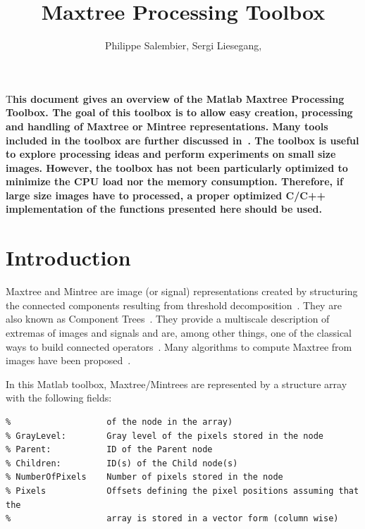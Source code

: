 \documentclass[DIV=calc, paper=a4, fontsize=11pt]{scrartcl}	 %
\title{Maxtree Processing Toolbox} %
\author{Philippe Salembier, Sergi Liesegang, } %
\date{} %
\newcommand{\initial}[1]{ %
\lettrine[lines=3,lhang=0.3,nindent=0em]{
\color{DarkGoldenrod}
{\textsf{#1}}}{}}
\begin{document}
\maketitle %

\thispagestyle{fancy} %


\initial{T}\textbf{his document gives an overview of the Matlab Maxtree Processing Toolbox. The goal of this toolbox is to allow easy creation, processing and handling of Maxtree or Mintree representations. Many tools included in the toolbox are further discussed in~\cite{Salembier-TIP-2017}. The toolbox is useful to explore processing ideas and perform experiments on small size images. However, the toolbox has not been particularly optimized to minimize the CPU load nor the memory consumption. Therefore, if large size images have to processed, a proper optimized C/C++ implementation of the functions presented here should be used. }

\tableofcontents

\section{Introduction}

Maxtree and Mintree are image (or signal) representations created by structuring the connected components resulting from  threshold decomposition~\cite{Salembier-Eusipco-1996,salembier_IEEEIP98}. They are also known as Component Trees~\cite{Jones-1997}. They provide a multiscale  description of extremas of images and signals and are, among other things, one of the classical ways to build connected operators~\cite{Salembier-IEEEIP-1995,Salembier-SPMag-2009}. Many algorithms to compute Maxtree from images have been proposed~\cite{Carlinet-IP-2014}.

In this Matlab toolbox, Maxtree/Mintrees are represented by a structure array with the following fields: 
\begin{lstlisting}[aboveskip=0.5 \baselineskip]
% Node:            	ID on the node in the tree (it is also the position 
%					of the node in the array)
% GrayLevel:       	Gray level of the pixels stored in the node
% Parent:          	ID of the Parent node
% Children:        	ID(s) of the Child node(s)
% NumberOfPixels	Number of pixels stored in the node
% Pixels			Offsets defining the pixel positions assuming that the 
%					array is stored in a vector form (column wise) 
\end{lstlisting}
\end{document}

